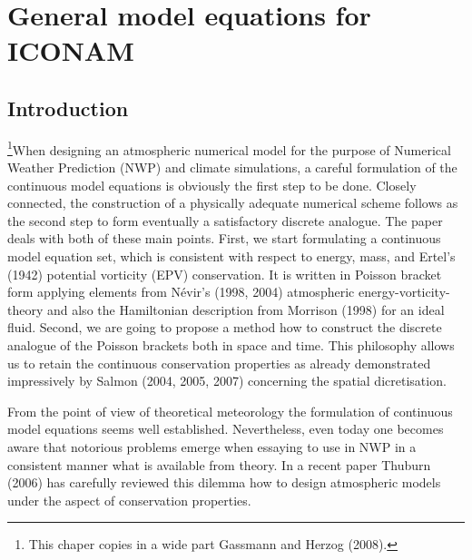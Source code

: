 \chapter{General model equations for ICONAM}

\section{Introduction}

\footnote{This chaper copies in a wide part Gassmann and Herzog (2008).}When designing an atmospheric numerical model for the purpose of Numerical Weather Prediction (NWP) and climate simulations, a careful formulation of the continuous model equations is obviously the first step to be done. Closely connected, the construction of a physically adequate numerical scheme follows as the second step to form eventually a satisfactory discrete analogue. The paper deals with both of these main points. First, we start formulating a continuous model equation set, which is consistent with respect to energy, mass, and Ertel's (1942) potential vorticity (EPV) conservation. It is written in Poisson bracket form applying elements from N\'evir's (1998, 2004) atmospheric energy-vorticity-theory and also the Hamiltonian description from Morrison (1998) for an ideal fluid. Second, we are going to propose a method how to construct the discrete analogue of the Poisson brackets both in space and time. This philosophy allows us to retain the continuous conservation properties as already demonstrated impressively by Salmon (2004, 2005, 2007) concerning the spatial dicretisation.

From the point of view of theoretical meteorology the formulation of continuous model equations seems well established. Nevertheless, even today one becomes aware that notorious problems emerge when essaying to use in NWP in a consistent manner what is available from theory. In a recent paper Thuburn (2006) has carefully reviewed this dilemma how to design atmospheric models under the aspect of conservation properties.


